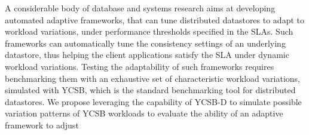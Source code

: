 \documentclass{vldb}
\begin{document}
             \par %
              A considerable body of database and systems research \cite{conf/wecwis/YuV00, Terry:2013:CSL:2517349.2522731, Ardekani:2014:SGC:2685048.2685077} %
                aims at developing automated adaptive frameworks, that can tune distributed datastores to adapt to workload variations, under performance thresholds specified in
              the SLAs. Such frameworks can automatically tune the consistency settings of an
              underlying datastore, thus helping the client applications satisfy the SLA under dynamic workload
              variations. Testing the adaptability of such frameworks requires benchmarking them with an exhaustive
              set of characteristic workload variations, simulated with YCSB, which is the standard benchmarking
              tool for distributed datastores. We propose leveraging the capability of YCSB-D to simulate possible
               variation patterns of YCSB workloads to evaluate the ability of an adaptive framework to adjust
\end{document}

